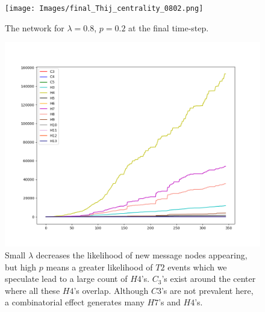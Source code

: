 \begin{figure}[h!]
    \texttt{[image: Images/final\_Thij\_centrality\_0802.png]}
    \centering
    \caption{The network for $\lambda=0.8$, $p=0.2$ at the final time-step.}
    \label{fig:network0802}
\end{figure}

\clearpage

\begin{figure}[h!]
    \includegraphics[width=16cm]{Images/twitter_sim_for_stats_3_0.2_0.8.png}
    \centering
    \caption{Small $\lambda$ decreases the likelihood of new message nodes appearing, but 
    high $p$ means a greater likelihood of $T2$ events which we speculate lead to a large
    count of $H4$'s. $C_3$'s exist around the center where all these $H4$'s
    overlap. Although $C3$'s are not prevalent here, a combinatorial effect generates 
    many $H7$'s and $H4$'s.}
    \label{fig:thij0208}
\end{figure}


